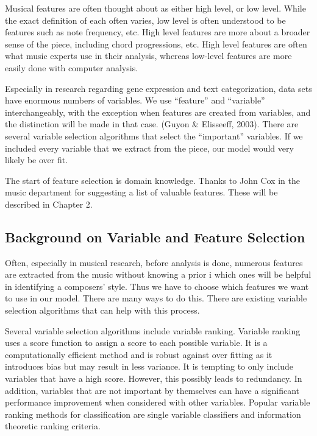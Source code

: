 \documentclass[12pt,twoside]{reedthesis}
\theoremstyle{definition}
\theoremstyle{definition}
\theoremstyle{definition}
\theoremstyle{remark}
\begin{document}
Musical features are often thought about as either high level, or low
level. While the exact definition of each often varies, low level is
often understood to be features such as note frequency, etc. High level
features are more about a broader sense of the piece, including chord
progressions, etc. High level features are often what music experts use
in their analysis, whereas low-level features are more easily done with
computer analysis.

Especially in research regarding gene expression and text
categorization, data sets have enormous numbers of variables. We use
``feature'' and ``variable'' interchangeably, with the exception when
features are created from variables, and the distinction will be made in
that case. (Guyon \& Elisseeff, 2003). There are several variable
selection algorithms that select the ``important'' variables. If we
included every variable that we extract from the piece, our model would
very likely be over fit.

The start of feature selection is domain knowledge. Thanks to John Cox
in the music department for suggesting a list of valuable features.
These will be described in Chapter 2.

\subsection{Background on Variable and Feature
Selection}\label{background-on-variable-and-feature-selection}

Often, especially in musical research, before analysis is done, numerous
features are extracted from the music without knowing a prior i which
ones will be helpful in identifying a composers' style. Thus we have to
choose which features we want to use in our model. There are many ways
to do this. There are existing variable selection algorithms that can
help with this process.

Several variable selection algorithms include variable ranking. Variable
ranking uses a score function to assign a score to each possible
variable. It is a computationally efficient method and is robust against
over fitting as it introduces bias but may result in less variance. It
is tempting to only include variables that have a high score. However,
this possibly leads to redundancy. In addition, variables that are not
important by themselves can have a significant performance improvement
when considered with other variables. Popular variable ranking methods
for classification are single variable classifiers and information
theoretic ranking criteria.
\end{document}
